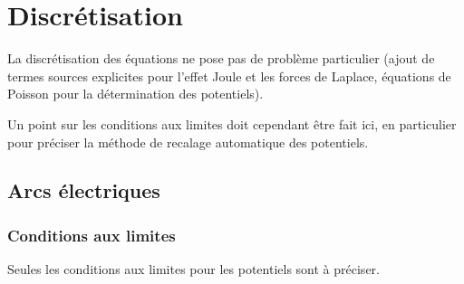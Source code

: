 %
% 
%
% 
% 
% 
%
%
\section{Discr\'etisation}

La discr\'etisation des \'equations ne pose pas de probl\`eme particulier
(ajout de termes sources explicites pour l'effet Joule et les forces de Laplace,
\'equations de Poisson pour la d\'etermination des potentiels). 

Un point sur les conditions aux limites doit cependant \^etre fait ici, en
particulier pour pr\'eciser la m\'ethode de recalage automatique des
potentiels. 

 

\subsection{Arcs \'electriques}

\subsubsection{Conditions aux limites}

Seules les conditions aux limites pour les potentiels sont \`a pr\'eciser. 

